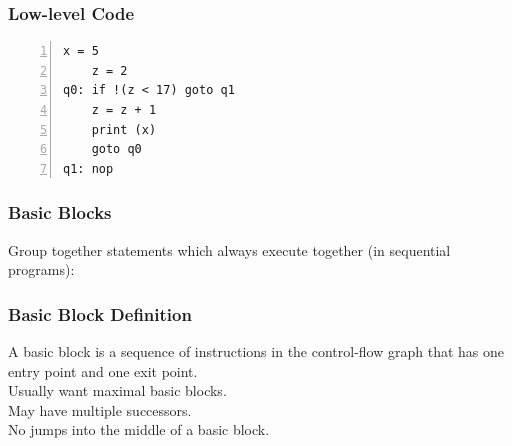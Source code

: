 \documentclass{beamer}
\newenvironment{changemargin}[1]{%
  \begin{list}{}{%
    \setlength{\topsep}{0pt}%
    \setlength{\leftmargin}{#1}%
    \setlength{\rightmargin}{1em}
    \setlength{\listparindent}{\parindent}%
    \setlength{\itemindent}{\parindent}%
    \setlength{\parsep}{\parskip}%
  }%
  \item[]}{\end{list}}
\begin{document}
\begin{frame}[fragile]
  \frametitle{Low-level Code}

\begin{changemargin}{2em}
\begin{lstlisting}[numbers=left]
    x = 5
    z = 2
q0: if !(z < 17) goto q1
    z = z + 1
    print (x)
    goto q0
q1: nop
\end{lstlisting}
\end{changemargin}
\end{frame}

\begin{frame}
  \frametitle{Basic Blocks}
\begin{changemargin}{2cm}
  Group together
  statements which always execute together (in sequential programs):
\end{changemargin}

\begin{center}
\end{center}
\end{frame}

\begin{frame}
  \frametitle{Basic Block Definition}
  \begin{changemargin}{1cm}
    A \alert{basic block} is a sequence of instructions in the control-flow graph
    that has one entry point and one exit point.\\[1em]

    Usually want maximal basic blocks.\\[1em]

    May have multiple successors.\\[1em]

    No jumps into the middle of a basic block.
  \end{changemargin}
\end{frame}
\end{document}
